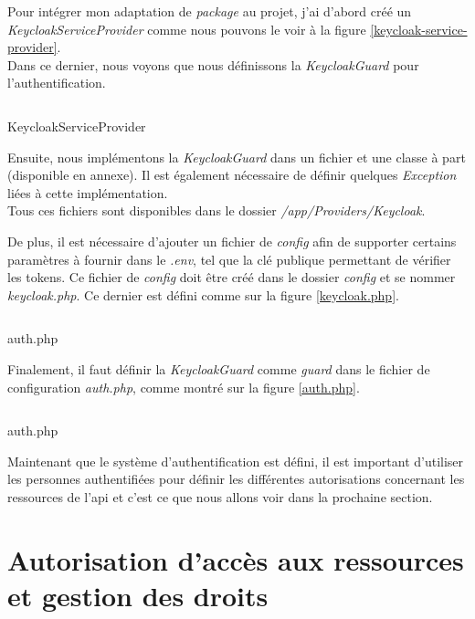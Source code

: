 \documentclass[
    iai, %
    il, %
]{heig-tb}
\begin{document}
Pour intégrer mon adaptation de \emph{package} au projet, j'ai d'abord créé un \emph{KeycloakServiceProvider} comme nous pouvons le voir à la figure \ref{keycloak-service-provider}. \\
Dans ce dernier, nous voyons que nous définissons la \emph{KeycloakGuard} pour l'authentification.

\begin{listing}[H]
    \inputminted{php}{assets/code/KeycloakServiceProvider.php}
    \caption{KeycloakServiceProvider \label{keycloak-service-provider}}
\end{listing}

Ensuite, nous implémentons la \emph{KeycloakGuard} dans un fichier et une classe à part (disponible en annexe). Il est également nécessaire de définir quelques \emph{Exception} liées à cette implémentation. \\
Tous ces fichiers sont disponibles dans le dossier \emph{/app/Providers/Keycloak}.

De plus, il est nécessaire d'ajouter un fichier de \emph{config} afin de supporter certains paramètres à fournir dans le \emph{.env}, tel que la clé publique permettant de vérifier les tokens. Ce fichier de \emph{config} doit être créé dans le dossier \emph{config} et se nommer \emph{keycloak.php}. Ce dernier est défini comme sur la figure \ref{keycloak.php}.

\begin{listing}[h]
    \inputminted{php}{assets/code/keycloak.php}
    \caption{auth.php \label{keycloak.php}}
\end{listing}

Finalement, il faut définir la \emph{KeycloakGuard} comme \emph{guard} dans le fichier de configuration \emph{auth.php}, comme montré sur la figure \ref{auth.php}.

\begin{listing}[h]
    \inputminted{php}{assets/code/auth.php}
    \caption{auth.php \label{auth.php}}
\end{listing}

Maintenant que le système d'authentification est défini, il est important d'utiliser les personnes authentifiées pour définir les différentes autorisations concernant les ressources de l'\Gls{api} et c'est ce que nous allons voir dans la prochaine section.

\newpage

\section{Autorisation d'accès aux ressources et gestion des droits}
\end{document}
